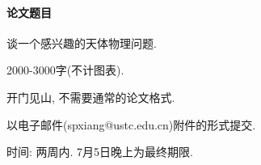 \documentclass{ctexart}
\begin{document}
\paragraph{论文题目} %
\label{par:论文题目}

\begin{cenum}
    \item 谈一个感兴趣的天体物理问题.
    \item 2000-3000字(不计图表).
    \item 开门见山, 不需要通常的论文格式.
    \item 以电子邮件(spxiang@ustc.edu.cn)附件的形式提交.
    \item 时间: 两周内. 7月5日晚上为最终期限.
\end{cenum}

\end{document}
